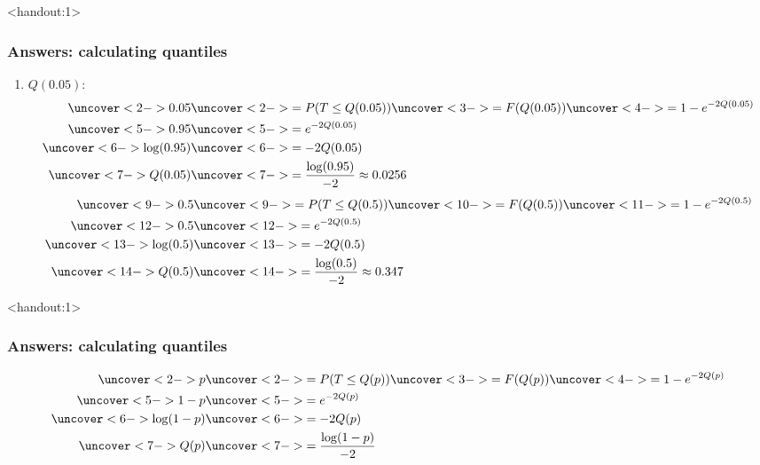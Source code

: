 \documentclass[handout]{beamer}\usepackage{graphicx, color}
\newcommand{\answers}{1}
\numberwithin{equation}{section}
\begin{document}
\begin{frame}<handout:\answers>
\frametitle{Answers: calculating quantiles} \small
\begin{enumerate}[1. ]
\item $Q(0.05)$:
\begin{align*}
 \uncover<2->{0.05} &  \uncover<2->{= P(T \le Q(0.05))}  \uncover<3->{= F(Q(0.05))}  \uncover<4->{= 1 - e^{-2 Q(0.05)} } \\
 \uncover<5->{0.95} &  \uncover<5->{= e^{-2 Q(0.05)}} \\
 \uncover<6->{\log (0.95)} &  \uncover<6->{= -2 Q(0.05)} \\
 \uncover<7->{Q(0.05)} &  \uncover<7->{= \frac{\log(0.95)}{-2} \approx 0.0256}
\end{align*}
\begin{align*}
 \uncover<9->{0.5} &  \uncover<9->{= P(T \le Q(0.5))}  \uncover<10->{ = F(Q(0.5))}  \uncover<11->{= 1 - e^{-2 Q(0.5)}}  \\
 \uncover<12->{0.5} &  \uncover<12->{= e^{-2 Q(0.5)}} \\
 \uncover<13->{\log (0.5)} &  \uncover<13->{= -2 Q(0.5)} \\
 \uncover<14->{Q(0.5)} &  \uncover<14->{= \frac{\log(0.5)}{-2} \approx 0.347}
\end{align*}

\end{enumerate}
\end{frame}

\begin{frame}<handout:\answers>
\frametitle{Answers: calculating quantiles} \small
\begin{enumerate}[1. ]
\setcounter{enumi}{2}


\begin{align*}
 \uncover<2->{p} & \uncover<2->{= P(T \le Q(p))}  \uncover<3->{ = F(Q(p)) }  \uncover<4->{= 1 - e^{-2 Q(p)}}  \\
 \uncover<5->{1-p} &  \uncover<5->{= e^{-2 Q(p)}} \\
 \uncover<6->{\log (1-p) }&  \uncover<6->{= -2 Q(p)} \\
 \uncover<7->{Q(p)} &\uncover<7->{= \frac{\log (1-p)}{-2}}
\end{align*}

\end{enumerate}
\end{frame}
\end{document}
